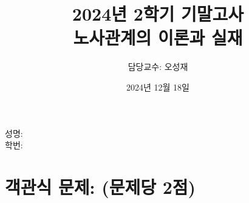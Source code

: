 \documentclass[11pt,answers]{exam} %
\begin{document}

    \title{\relax
        2024년 2학기 기말고사 \\
        \Large
        노사관계의 이론과 실재
    }
    \author{담당교수: 오성재}
    \date{2024년 12월 18일}
    \maketitle

    \noindent
    성명: \makebox[.3\textwidth]{\hrulefill} \\[3pt]
    학번: \makebox[.3\textwidth]{\hrulefill}

    \addpoints\relax

\section*{객관식 문제: (문제당 2점)}
\end{document}
